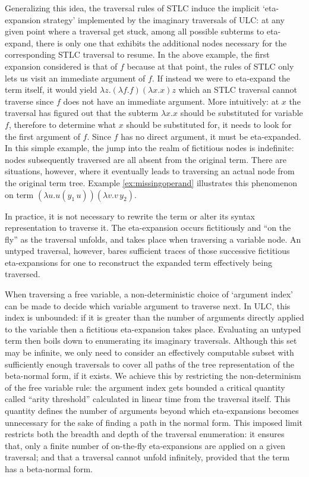 \documentclass{elsarticle}
\theoremstyle{plain}
\theoremstyle{definition}
\theoremstyle{remark}
\begin{document}
Generalizing this idea, the traversal rules of STLC induce the implicit `eta-expansion strategy' implemented by the imaginary traversals of ULC: at any given point where a traversal get stuck, among all possible subterms to eta-expand, there is only one that exhibits the additional nodes necessary for the corresponding STLC traversal to resume.
In the above example, the first expansion considered is that of $f$ because at that point, the rules of STLC only lets us
visit an immediate argument of $f$. If instead we were to eta-expand the term itself, it would yield $\lambda z. (\lambda f .f)(\lambda x.x) z$
which an STLC traversal cannot traverse since $f$ does not have an immediate argument. More intuitively: at $x$ the traversal has figured out that the subterm $\lambda x.x$ should be substituted for variable $f$, therefore to determine what $x$ should be substituted for, it needs to look for the first argument of $f$. Since $f$ has no direct argument, it must be eta-expanded. In this simple example, the jump into the realm of fictitious nodes is indefinite: nodes subsequently traversed are all absent from the original term. There are situations, however, where it eventually leads to traversing an actual node from the original term tree. Example \ref{ex:missingoperand} illustrates this phenomenon on term $(\lambda u . u(y_1\, u)) (\lambda v . v\, y_2)$.

In practice, it is not necessary to rewrite the term or alter its syntax representation to traverse it. The eta-expansion occurs fictitiously and ``on the fly'' as the traversal unfolds, and takes place when traversing a variable node. An untyped traversal, however, bares sufficient traces of those successive fictitious eta-expansions for one to reconstruct the expanded term effectively being traversed.

When traversing a free variable, a non-deterministic choice of `argument index' can be made to decide which variable argument to traverse next.
In ULC, this index is unbounded: if it is greater than the number of arguments directly applied to the variable then a fictitious eta-expansion takes place. Evaluating an untyped term then boils down to enumerating its imaginary traversals. Although this set may be infinite, we only need to consider an effectively computable subset with sufficiently enough traversals to cover all paths of the tree representation of the beta-normal form, if it exists. We achieve this by restricting the non-determinism of the free variable rule: the argument index gets bounded a critical quantity called ``arity threshold''  calculated in linear time from the traversal itself.
This quantity defines the number of arguments beyond which eta-expansions becomes unnecessary for the sake of finding a path in the normal form. This imposed limit restricts both the breadth and depth of the traversal enumeration: it ensures that, only a finite number of on-the-fly eta-expansions are applied on a given traversal; and that a traversal cannot unfold infinitely, provided that the term has a beta-normal form.
\end{document}
